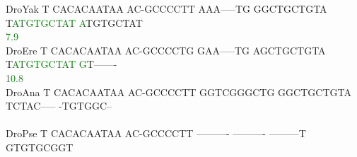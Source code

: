 \documentclass[11pt,twoside,reqno,a4paper]{article}
\begin{document}
{DroYak	T	CACACAATAA	AC-GCCCCTT	AAA-----TG	GGCTGCTGTA	T\textcolor{Green}{A}\textcolor{Green}{T}\textcolor{Green}{G}\textcolor{Green}{T}\textcolor{Green}{G}\textcolor{Green}{C}\textcolor{Green}{T}\textcolor{Green}{A}\textcolor{Green}{T}	\textcolor{Green}{A}TGTGCTAT\\
\hspace*{7\charwidth}\hspace*{1\charwidth}\hspace*{1\charwidth}\hspace*{1\charwidth}\hspace*{1\charwidth}\hspace*{1\charwidth}\hspace*{42\charwidth}\textcolor{Green}{7.9}\hspace*{1\charwidth}\\
DroEre	T	CACACAATAA	AC-GCCCCTG	GAA-----TG	AGCTGCTGTA	T\textcolor{Green}{A}\textcolor{Green}{T}\textcolor{Green}{G}\textcolor{Green}{T}\textcolor{Green}{G}\textcolor{Green}{C}\textcolor{Green}{T}\textcolor{Green}{A}\textcolor{Green}{T}	\textcolor{Green}{G}T-------\\
\hspace*{7\charwidth}\hspace*{1\charwidth}\hspace*{1\charwidth}\hspace*{1\charwidth}\hspace*{1\charwidth}\hspace*{1\charwidth}\hspace*{42\charwidth}\textcolor{Green}{10.8}\hspace*{1\charwidth}\\
DroAna	T	CACACAATAA	AC-GCCCCTT	GGTCGGGCTG	GGCTGCTGTA	TCTAC-----	-TGTGGC--\\
\hspace*{7\charwidth}\hspace*{1\charwidth}\hspace*{1\charwidth}\hspace*{1\charwidth}\hspace*{1\charwidth}\hspace*{1\charwidth}\hspace*{1\charwidth}\\
DroPse	T	CACACAATAA	AC-GCCCCTT	----------	----------	---------T	GTGTGCGGT\\
\hspace*{7\charwidth}\hspace*{1\charwidth}\hspace*{1\charwidth}\hspace*{1\charwidth}\hspace*{1\charwidth}\hspace*{1\charwidth}\hspace*{1\charwidth}\\
}
\end{document}
